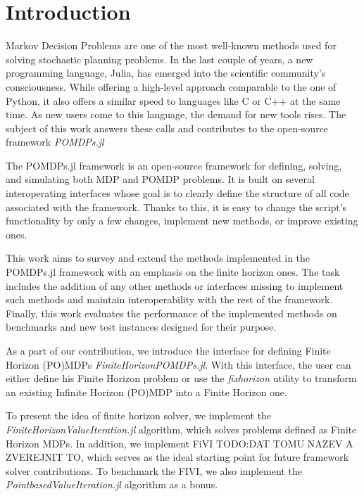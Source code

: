 \chapter{Introduction}

Markov Decision Problems are one of the most well-known methods used for solving stochastic planning problems. In the last couple of years, a new programming language, Julia, has emerged into the scientific community's consciousness. While offering a high-level approach comparable to the one of Python, it also offers a similar speed to languages like C or C++ at the same time. As new users come to this language, the demand for new tools rises. The subject of this work answers these calls and contributes to the open-source framework \textit{POMDPs.jl} 

The POMDPs.jl framework is an open-source framework for defining, solving, and simulating both MDP and POMDP problems. It is built on several interoperating interfaces whose goal is to clearly define the structure of all code associated with the framework. Thanks to this, it is easy to change the script's functionality by only a few changes, implement new methods, or improve existing ones.


This work aims to survey and extend the methods implemented in the POMDPs.jl framework with an emphasis on the finite horizon ones. The task includes the addition of any other methods or interfaces missing to implement such methods and maintain interoperability with the rest of the framework. Finally, this work evaluates the performance of the implemented methods on benchmarks and new test instances designed for their purpose.

As a part of our contribution, we introduce the interface for defining Finite Horizon (PO)MDPs \textit{FiniteHorizonPOMDPs.jl}. With this interface, the user can either define his Finite Horizon problem or use the \textit{fixhorizon} utility to transform an existing Infinite Horizon (PO)MDP into a Finite Horizon one.

To present the idea of finite horizon solver, we implement the \textit{FiniteHorizonValueIteration.jl} algorithm, which solves problems defined as Finite Horizon MDPs. In addition, we implement FiVI TODO:DAT TOMU NAZEV A ZVEREJNIT TO, which serves as the ideal starting point for future framework solver contributions. To benchmark the FIVI, we also implement the \textit{PointbasedValueIteration.jl} algorithm as a bonus.



